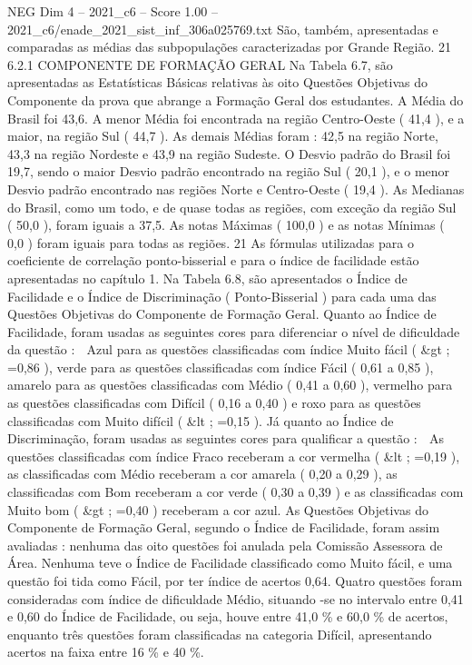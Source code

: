 \begin{textsample}{NEG Dim 4 – 2021\_c6 – Score 1.00 – 2021\_c6/enade\_2021\_sist\_inf\_306a025769.txt}
São, também, apresentadas e comparadas as médias das subpopulações caracterizadas por Grande Região. 21 6.2.1 COMPONENTE DE FORMAÇÃO GERAL Na Tabela 6.7, são apresentadas as Estatísticas Básicas relativas às oito Questões Objetivas do Componente da prova que abrange a Formação Geral dos estudantes.
A Média do Brasil foi 43,6.
A menor Média foi encontrada na região Centro-Oeste ( 41,4 ), e a maior, na região Sul ( 44,7 ).
As demais Médias foram : 42,5 na região Norte, 43,3 na região Nordeste e 43,9 na região Sudeste.
O Desvio padrão do Brasil foi 19,7, sendo o maior Desvio padrão encontrado na região Sul ( 20,1 ), e o menor Desvio padrão encontrado nas regiões Norte e Centro-Oeste ( 19,4 ).
As Medianas do Brasil, como um todo, e de quase todas as regiões, com exceção da região Sul ( 50,0 ), foram iguais a 37,5.
As notas Máximas ( 100,0 ) e as notas Mínimas ( 0,0 ) foram iguais para todas as regiões. 21 As fórmulas utilizadas para o coeficiente de correlação ponto-bisserial e para o índice de facilidade estão apresentadas no capítulo 1.
Na Tabela 6.8, são apresentados o Índice de Facilidade e o Índice de Discriminação ( Ponto-Bisserial ) para cada uma das Questões Objetivas do Componente de Formação Geral.
Quanto ao Índice de Facilidade, foram usadas as seguintes cores para diferenciar o nível de dificuldade da questão :  Azul para as questões classificadas com índice Muito fácil ( \&gt ; =0,86 ), verde para as questões classificadas com índice Fácil ( 0,61 a 0,85 ), amarelo para as questões classificadas com Médio ( 0,41 a 0,60 ), vermelho para as questões classificadas com Difícil ( 0,16 a 0,40 ) e roxo para as questões classificadas com Muito difícil ( \&lt ; =0,15 ).
Já quanto ao Índice de Discriminação, foram usadas as seguintes cores para qualificar a questão :  As questões classificadas com índice Fraco receberam a cor vermelha ( \&lt ; =0,19 ), as classificadas com Médio receberam a cor amarela ( 0,20 a 0,29 ), as classificadas com Bom receberam a cor verde ( 0,30 a 0,39 ) e as classificadas com Muito bom ( \&gt ; =0,40 ) receberam a cor azul.
As Questões Objetivas do Componente de Formação Geral, segundo o Índice de Facilidade, foram assim avaliadas : nenhuma das oito questões foi anulada pela Comissão Assessora de Área.
Nenhuma teve o Índice de Facilidade classificado como Muito fácil, e uma questão foi tida como Fácil, por ter índice de acertos 0,64.
Quatro questões foram consideradas com índice de dificuldade Médio, situando -se no intervalo entre 0,41 e 0,60 do Índice de Facilidade, ou seja, houve entre 41,0 \% e 60,0 \% de acertos, enquanto três questões foram classificadas na categoria Difícil, apresentando acertos na faixa entre 16 \% e 40 \%.

\end{textsample}
